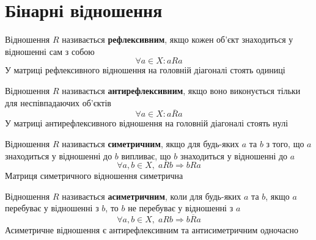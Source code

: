 \section{Бінарні відношення}
\label{sec:relationships}

\begin{large}
    \begin{theorem}
        Відношення $R$ називається \textbf{рефлексивним},
        якщо кожен об'єкт знаходиться у відношенні сам з собою
        \begin{equation}
            \label{eq:relp_reflexive}
            \forall a \in X:
            a R a
        \end{equation}
        У матриці рефлексивного відношення
        на головній діагоналі стоять одиниці
    \end{theorem}


    \begin{theorem}
        Відношення $R$ називається \textbf{антирефлексивним},
        якщо воно виконується тільки для неспівпадаючих об'єктів
        \begin{equation}
            \label{eq:relp_antireflexive}
            \forall a \in X:
            a \overline{R} a
        \end{equation}
        У матриці антирефлексивного відношення
        на головній діагоналі стоять нулі
    \end{theorem}

    \begin{theorem}
        Відношення $R$ називається \textbf{симетричним},
        якщо для будь-яких $a$ та $b$ з того,
        що $a$ знаходиться у відношенні до $b$
        випливає, що $b$ знаходиться у відношенні до $a$
        \begin{equation}
            \label{eq:relp_symmetric}
            \forall a, b \in X,
            \; a R b
            \Rightarrow
            b R a
        \end{equation}
        Матриця симетричного відношення симетрична
    \end{theorem}

    \begin{theorem}
        Відношення $R$ називається \textbf{асиметричним},
        коли для будь-яких $a$ та $b$,
        якщо $a$ перебуває у відношенні з $b$,
        то $b$ не перебуває у відношенні з $a$
        \begin{equation}
            \label{eq:relp_asymmetric}
            \forall a, b \in X,
            \; a R b
            \Rightarrow
            b \overline{R} a
        \end{equation}
        Асиметричне відношення є антирефлексивним
        та антисиметричним одночасно
    \end{theorem}


\end{large}
